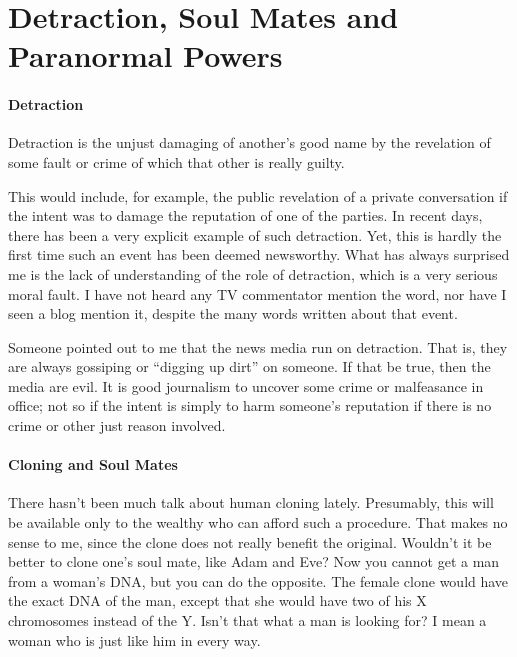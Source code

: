 \section{Detraction, Soul Mates and Paranormal Powers}

\paragraph{Detraction}


\begin{quotex}
Detraction is the unjust damaging of another's good name by the revelation of some fault or crime of which that other is really guilty.
\end{quotex}


This would include, for example, the public revelation of a private conversation if the intent was to damage the reputation of one of the parties. In recent days, there has been a very explicit example of such detraction. Yet, this is hardly the first time such an event has been deemed newsworthy. What has always surprised me is the lack of understanding of the role of detraction, which is a very serious moral fault. I have not heard any TV commentator mention the word, nor have I seen a blog mention it, despite the many words written about that event.

Someone pointed out to me that the news media run on detraction. That is, they are always gossiping or ``digging up dirt'' on someone. If that be true, then the media are evil. It is good journalism to uncover some crime or malfeasance in office; not so if the intent is simply to harm someone's reputation if there is no crime or other just reason involved.

\paragraph{Cloning and Soul Mates}


There hasn't been much talk about human cloning lately. Presumably, this will be available only to the wealthy who can afford such a procedure. That makes no sense to me, since the clone does not really benefit the original. Wouldn't it be better to clone one's soul mate, like Adam and Eve? Now you cannot get a man from a woman's DNA, but you can do the opposite. The female clone would have the exact DNA of the man, except that she would have two of his X chromosomes instead of the Y. Isn't that what a man is looking for? I mean a woman who is just like him in every way.

